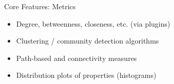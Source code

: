 \begin{frame}{Core Features: Metrics}
	\begin{itemize}
		\item Degree, betweenness, closeness, etc. (via plugins)
		\item Clustering / community detection algorithms
		\item Path‑based and connectivity measures
		\item Distribution plots of properties (histograms)
	\end{itemize}
\end{frame}